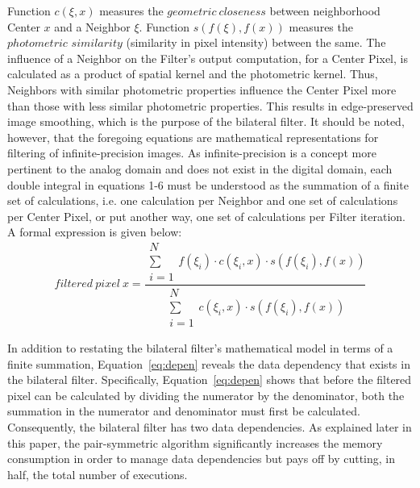 \documentclass{IEEEtran}
\begin{document}
Function $c(\xi,x)$ measures the $geometric~closeness$ between neighborhood Center $x$ and a Neighbor $\xi$. Function $s(f(\xi),f(x))$ measures the $photometric$ $similarity$ (similarity in pixel intensity) between the same. The influence of a Neighbor on the Filter's output computation, for a Center Pixel, is calculated as a product of spatial kernel and the photometric kernel. Thus, Neighbors with similar photometric properties influence the Center Pixel more than those with less similar photometric properties. This results in edge-preserved image smoothing, which is the purpose of the bilateral filter. It should be noted, however, that the foregoing equations are mathematical representations for filtering of infinite-precision images. As infinite-precision is a concept more pertinent to the analog domain and does not exist in the digital domain, each double integral in equations 1-6 must be understood as the summation of a finite set of calculations, i.e. one calculation per Neighbor and one set of calculations per Center Pixel, or put another way, one set of calculations per Filter iteration. A formal expression is given below:
\begin{equation}
\label{eq:depen}
filtered\: pixel\: x=\frac{\substack{N\\
\sum\\
i=1
}
f(\xi_{i})\cdot c(\xi_{i},x)\cdot s(f(\xi_{i}),f(x))}{\substack{N\\
\sum\\
i=1
}
c(\xi_{i},x)\cdot s(f(\xi_{i}),f(x))}
\end{equation}

In addition to restating the bilateral filter's mathematical model in terms of a finite summation, Equation~\ref{eq:depen} reveals the data dependency that exists in the bilateral filter. Specifically, Equation~\ref{eq:depen} shows that before the filtered pixel can be calculated by dividing the numerator by the denominator, both the summation in the numerator and denominator must first be calculated. Consequently, the bilateral filter has two data dependencies. As explained later in this paper, the pair-symmetric algorithm significantly increases the memory consumption in order to manage data dependencies but pays off by cutting, in half, the total number of executions.
\end{document}
